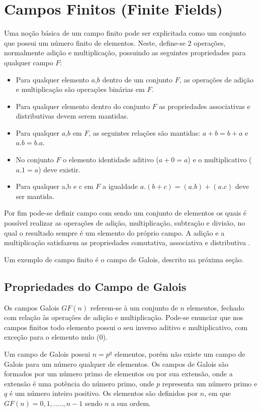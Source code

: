 \chapter[Campos Finitos (Finite Fields)]{Campos Finitos (Finite Fields)} \label{teo:filds}

Uma noção básica de um campo finito pode ser explicitada como um conjunto que possui um número finito de elementos. Neste, define-se 2 operações, normalmente adição e multiplicação, possuindo as seguintes propriedades para qualquer campo $F$:

\begin{itemize}
	\item Para qualquer elemento $a$,$b$ dentro de um conjunto $F$, as operações de adição e multiplicação são operações binárias em $F$.
	\item Para qualquer elemento dentro do conjunto $F$ as propriedades associativas e distributivas devem serem mantidas. 
	\item Para qualquer $a$,$b$ em $F$, as seguintes relações são mantidas: $a+b = b+a$ e $a.b = b.a$.
	\item No conjunto $F$ o elemento identidade aditivo ($a + 0 = a$) e o multiplicativo ($a.1=a$) deve existir.
	\item Para qualquer a,b e c em $F$ a igualdade $a.(b+c)=(a.b)+(a.c)$ deve ser mantida.
\end{itemize}

Por fim pode-se definir campo com sendo um conjunto de elementos os quais é possível realizar as operações de adição, multiplicação, subtração e divisão, no qual o resultado sempre é um elemento do próprio campo. A adição e a multiplicação satisfazem as propriedades comutativa, associativa e distributiva \cite{Daniel2011}.

Um exemplo de campo finito é o campo de Galois, descrito na próxima seção.

\section{Propriedades do Campo de Galois}

Os campos Galois $GF(n)$ referem-se à um conjunto de $n$ elementos, fechado com relação às operações de adição e multiplicação. Pode-se enunciar que nos campos finitos todo elemento possui o seu inverso aditivo e multiplicativo, com exceção para o elemento nulo ($0$).

Um campo de Galois possui $ n = p^{q}$ elementos, porém não existe um campo de Galois para um número qualquer de elementos. Os campos de Galois são formados por um número primo de elementos ou por sua extensão, onde a extensão é uma potência do número primo, onde $p$ representa um número primo e $q$ é um número inteiro positivo. Os elementos são definidos por $n$, em que $GF(n) = {0,1, ....., n-1}$ sendo $n$ a sua ordem. 

